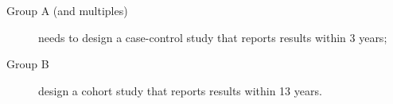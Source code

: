 \documentclass[a4paper,11pt]{scrartcl}
\newcommand{\ignore}[1]{}
\theoremstyle{plain}
\theoremstyle{remark}
\theoremstyle{definition}
\begin{document}
\medskip


\begin{description}
\item[Group A (and multiples)] needs to design a case-control study that reports results within 3 years;
\item[Group B] design a cohort study that reports results within 13 years.
\end{description}

\ignore{
\textit{\textbf{Hand out the student sheets which contain the questions to fill in to design the studies (the first group should answer the left hand column and the second group the right hand column).}}



\subsection{Group presentations (25 minutes)}



}
\end{document}
